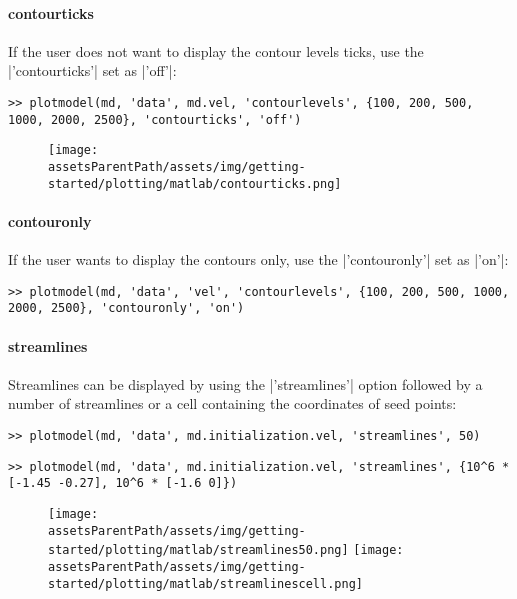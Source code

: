 \paragraph{contourticks}
If the user does not want to display the contour levels ticks, use the \lstinlinebg|'contourticks'| set as \lstinlinebg|'off'|:
\begin{lstlisting}
>> plotmodel(md, 'data', md.vel, 'contourlevels', {100, 200, 500, 1000, 2000, 2500}, 'contourticks', 'off')
\end{lstlisting}
\begin{figure}[H]
	\begin{center}
		\texttt{[image: \\assetsParentPath/assets/img/getting-started/plotting/matlab/contourticks.png]}
	\end{center}
\end{figure}

\paragraph{contouronly}
If the user wants to display the contours only, use the \lstinlinebg|'contouronly'| set as \lstinlinebg|'on'|:
\begin{lstlisting}
>> plotmodel(md, 'data', 'vel', 'contourlevels', {100, 200, 500, 1000, 2000, 2500}, 'contouronly', 'on')
\end{lstlisting}

\paragraph{streamlines}
Streamlines can be displayed by using the \lstinlinebg|'streamlines'| option followed by a number of streamlines or a cell containing the coordinates of seed points:
\begin{lstlisting}
>> plotmodel(md, 'data', md.initialization.vel, 'streamlines', 50)
\end{lstlisting}
\begin{lstlisting}
>> plotmodel(md, 'data', md.initialization.vel, 'streamlines', {10^6 * [-1.45 -0.27], 10^6 * [-1.6 0]})
\end{lstlisting}
\begin{figure}[H]
	\begin{center}
		\texttt{[image: \\assetsParentPath/assets/img/getting-started/plotting/matlab/streamlines50.png]}
		\texttt{[image: \\assetsParentPath/assets/img/getting-started/plotting/matlab/streamlinescell.png]}
	\end{center}
\end{figure}

